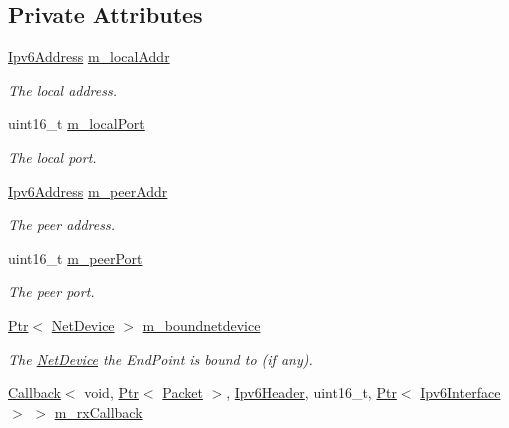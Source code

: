 \subsection*{Private Attributes}
\begin{DoxyCompactItemize}
\item 
\hyperlink{classns3_1_1Ipv6Address}{Ipv6\+Address} \hyperlink{classns3_1_1Ipv6EndPoint_aa080e0cb8a56f2c99ec42093da6dfb4b}{m\+\_\+local\+Addr}
\begin{DoxyCompactList}\small\item\em The local address. \end{DoxyCompactList}\item 
uint16\+\_\+t \hyperlink{classns3_1_1Ipv6EndPoint_addab74a83db5aac55fe0fd980e3e5657}{m\+\_\+local\+Port}
\begin{DoxyCompactList}\small\item\em The local port. \end{DoxyCompactList}\item 
\hyperlink{classns3_1_1Ipv6Address}{Ipv6\+Address} \hyperlink{classns3_1_1Ipv6EndPoint_a41293a8c07dc1bfc523a5b6eb1878234}{m\+\_\+peer\+Addr}
\begin{DoxyCompactList}\small\item\em The peer address. \end{DoxyCompactList}\item 
uint16\+\_\+t \hyperlink{classns3_1_1Ipv6EndPoint_a104e59d9ecccdfdc79639cd1d7a77f46}{m\+\_\+peer\+Port}
\begin{DoxyCompactList}\small\item\em The peer port. \end{DoxyCompactList}\item 
\hyperlink{classns3_1_1Ptr}{Ptr}$<$ \hyperlink{classns3_1_1NetDevice}{Net\+Device} $>$ \hyperlink{classns3_1_1Ipv6EndPoint_ada6134b53ad120cfac037b645fb0b081}{m\+\_\+boundnetdevice}
\begin{DoxyCompactList}\small\item\em The \hyperlink{classns3_1_1NetDevice}{Net\+Device} the End\+Point is bound to (if any). \end{DoxyCompactList}\item 
\hyperlink{classns3_1_1Callback}{Callback}$<$ void, \hyperlink{classns3_1_1Ptr}{Ptr}$<$ \hyperlink{classns3_1_1Packet}{Packet} $>$, \hyperlink{classns3_1_1Ipv6Header}{Ipv6\+Header}, uint16\+\_\+t, \hyperlink{classns3_1_1Ptr}{Ptr}$<$ \hyperlink{classns3_1_1Ipv6Interface}{Ipv6\+Interface} $>$ $>$ \hyperlink{classns3_1_1Ipv6EndPoint_a3c0d453fd0bba4dd65e228a07dd2cc10}{m\+\_\+rx\+Callback}

\end{DoxyCompactItemize}
